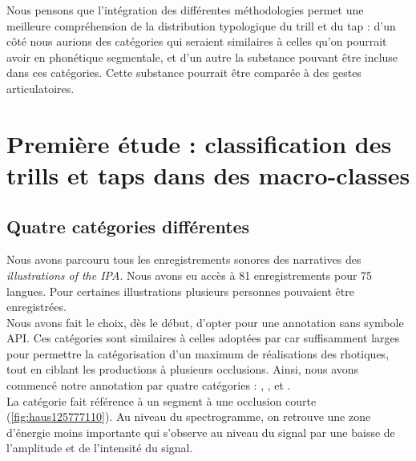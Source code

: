 Nous pensons que l'intégration des différentes méthodologies permet une meilleure compréhension de la distribution typologique du trill et du tap : d'un côté nous aurions des catégories qui seraient similaires à celles qu'on pourrait avoir en phonétique segmentale, et d'un autre la substance pouvant être incluse dans ces catégories. Cette substance pourrait être comparée à des gestes articulatoires.


\section{Première étude : classification des trills et taps dans des macro-classes}

\subsection{Quatre catégories différentes}

Nous avons parcouru tous les enregistrements sonores des narratives des \textit{illustrations of the IPA}. Nous avons eu accès à 81 enregistrements pour 75 langues. Pour certaines illustrations plusieurs personnes pouvaient être enregistrées.\\

Nous avons fait le choix, dès le début, d'opter pour une annotation sans symbole API. Ces catégories sont similaires à celles adoptées par \textcite{rafatSocioPhoneticInvestigationRhotics2010} car suffisamment larges pour permettre la catégorisation d'un maximum de réalisations des rhotiques, tout en ciblant les productions à plusieurs occlusions.
Ainsi, nous avons commencé notre annotation par quatre catégories : , ,  et .\\

La catégorie  fait référence à un segment à une occlusion courte (\autoref{fig:haus125777110}). Au niveau du spectrogramme, on retrouve une zone d'énergie moins importante qui s'observe au niveau du signal par une baisse de l'amplitude et de l'intensité du signal.\\

